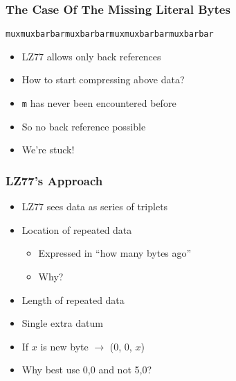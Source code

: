 \begin{frame}
  \frametitle{The Case Of The Missing Literal Bytes}
  \begin{center}
    \tt muxmuxbarbarmuxbarbarmuxmuxbarbarmuxbarbar
  \end{center}
  \vskip5mm
  \begin{itemize}
    \item LZ77 allows only back references
    \item How to start compressing above data?
    \item {\tt m} has never been encountered before
    \item So no back reference possible
    \item We're stuck!
  \end{itemize}
\end{frame}

\begin{frame}
  \frametitle{LZ77's Approach}
  \begin{itemize}
    \item LZ77 sees data as series of triplets
    \item<2-> Location of repeated data
              \begin{itemize}
                \item Expressed in ``how many bytes ago''
                \item Why? \cake
              \end{itemize}
    \item<3-> Length of repeated data
    \item<4-> Single extra datum
    \item<4-> If $x$ is new byte $\rightarrow$ (0, 0, $x$)
    \item<4-> Why best use 0,0 and not 5,0? \cake
  \end{itemize}
  \begin{center}
  \end{center}
\end{frame}

